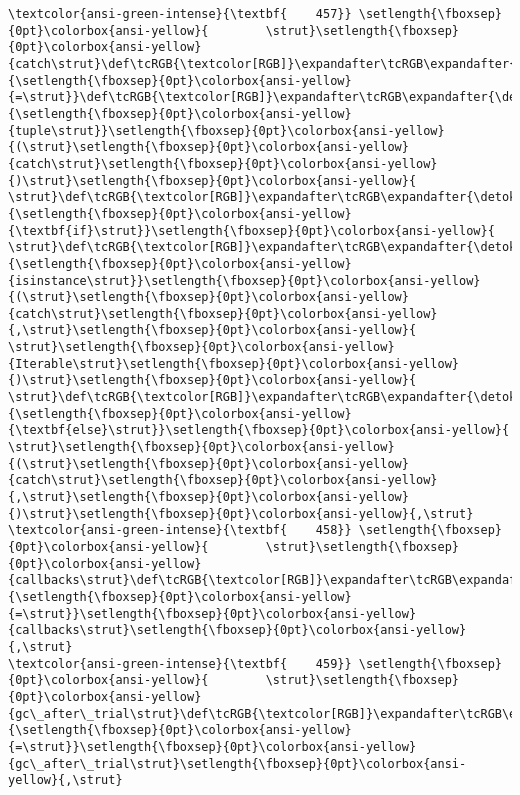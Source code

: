 \documentclass[11pt]{article}
\begin{document}
\begin{Verbatim}[commandchars=\\\{\}, frame=single, framerule=2mm, rulecolor=\color{outerrorbackground}]
\textcolor{ansi-green-intense}{\textbf{    457}} \setlength{\fboxsep}{0pt}\colorbox{ansi-yellow}{        \strut}\setlength{\fboxsep}{0pt}\colorbox{ansi-yellow}{catch\strut}\def\tcRGB{\textcolor[RGB]}\expandafter\tcRGB\expandafter{\detokenize{98,98,98}}{\setlength{\fboxsep}{0pt}\colorbox{ansi-yellow}{=\strut}}\def\tcRGB{\textcolor[RGB]}\expandafter\tcRGB\expandafter{\detokenize{0,135,0}}{\setlength{\fboxsep}{0pt}\colorbox{ansi-yellow}{tuple\strut}}\setlength{\fboxsep}{0pt}\colorbox{ansi-yellow}{(\strut}\setlength{\fboxsep}{0pt}\colorbox{ansi-yellow}{catch\strut}\setlength{\fboxsep}{0pt}\colorbox{ansi-yellow}{)\strut}\setlength{\fboxsep}{0pt}\colorbox{ansi-yellow}{ \strut}\def\tcRGB{\textcolor[RGB]}\expandafter\tcRGB\expandafter{\detokenize{0,135,0}}{\setlength{\fboxsep}{0pt}\colorbox{ansi-yellow}{\textbf{if}\strut}}\setlength{\fboxsep}{0pt}\colorbox{ansi-yellow}{ \strut}\def\tcRGB{\textcolor[RGB]}\expandafter\tcRGB\expandafter{\detokenize{0,135,0}}{\setlength{\fboxsep}{0pt}\colorbox{ansi-yellow}{isinstance\strut}}\setlength{\fboxsep}{0pt}\colorbox{ansi-yellow}{(\strut}\setlength{\fboxsep}{0pt}\colorbox{ansi-yellow}{catch\strut}\setlength{\fboxsep}{0pt}\colorbox{ansi-yellow}{,\strut}\setlength{\fboxsep}{0pt}\colorbox{ansi-yellow}{ \strut}\setlength{\fboxsep}{0pt}\colorbox{ansi-yellow}{Iterable\strut}\setlength{\fboxsep}{0pt}\colorbox{ansi-yellow}{)\strut}\setlength{\fboxsep}{0pt}\colorbox{ansi-yellow}{ \strut}\def\tcRGB{\textcolor[RGB]}\expandafter\tcRGB\expandafter{\detokenize{0,135,0}}{\setlength{\fboxsep}{0pt}\colorbox{ansi-yellow}{\textbf{else}\strut}}\setlength{\fboxsep}{0pt}\colorbox{ansi-yellow}{ \strut}\setlength{\fboxsep}{0pt}\colorbox{ansi-yellow}{(\strut}\setlength{\fboxsep}{0pt}\colorbox{ansi-yellow}{catch\strut}\setlength{\fboxsep}{0pt}\colorbox{ansi-yellow}{,\strut}\setlength{\fboxsep}{0pt}\colorbox{ansi-yellow}{)\strut}\setlength{\fboxsep}{0pt}\colorbox{ansi-yellow}{,\strut}
\textcolor{ansi-green-intense}{\textbf{    458}} \setlength{\fboxsep}{0pt}\colorbox{ansi-yellow}{        \strut}\setlength{\fboxsep}{0pt}\colorbox{ansi-yellow}{callbacks\strut}\def\tcRGB{\textcolor[RGB]}\expandafter\tcRGB\expandafter{\detokenize{98,98,98}}{\setlength{\fboxsep}{0pt}\colorbox{ansi-yellow}{=\strut}}\setlength{\fboxsep}{0pt}\colorbox{ansi-yellow}{callbacks\strut}\setlength{\fboxsep}{0pt}\colorbox{ansi-yellow}{,\strut}
\textcolor{ansi-green-intense}{\textbf{    459}} \setlength{\fboxsep}{0pt}\colorbox{ansi-yellow}{        \strut}\setlength{\fboxsep}{0pt}\colorbox{ansi-yellow}{gc\_after\_trial\strut}\def\tcRGB{\textcolor[RGB]}\expandafter\tcRGB\expandafter{\detokenize{98,98,98}}{\setlength{\fboxsep}{0pt}\colorbox{ansi-yellow}{=\strut}}\setlength{\fboxsep}{0pt}\colorbox{ansi-yellow}{gc\_after\_trial\strut}\setlength{\fboxsep}{0pt}\colorbox{ansi-yellow}{,\strut}

\end{Verbatim}
\end{document}
